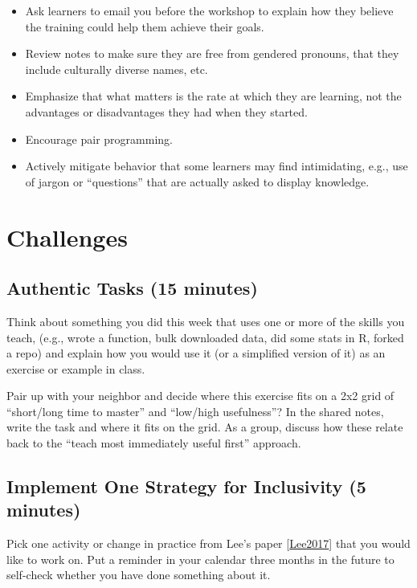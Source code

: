 \documentclass[10pt,statementpaper]{memoir}
\begin{document}
\begin{itemize}
\item
  Ask learners to email you before the workshop to explain how they
  believe the training could help them achieve their goals.
\item
  Review notes to make sure they are free from gendered pronouns, that
  they include culturally diverse names, etc.
\item
  Emphasize that what matters is the rate at which they are learning,
  not the advantages or disadvantages they had when they started.
\item
  Encourage pair programming.
\item
  Actively mitigate behavior that some learners may find intimidating,
  e.g., use of jargon or ``questions'' that are actually asked to
  display knowledge.
\end{itemize}

\section{Challenges}\label{challenges-6}

\subsection*{Authentic Tasks (15
minutes)}\label{authentic-tasks-15-minutes}

Think about something you did this week that uses one or more of the
skills you teach, (e.g., wrote a function, bulk downloaded data, did
some stats in R, forked a repo) and explain how you would use it (or a
simplified version of it) as an exercise or example in class.

Pair up with your neighbor and decide where this exercise fits on a 2x2
grid of ``short/long time to master'' and ``low/high usefulness''? In
the shared notes, write the task and where it fits on the grid. As a
group, discuss how these relate back to the ``teach most immediately
useful first'' approach.

\subsection*{Implement One Strategy for Inclusivity (5
minutes)}\label{implement-one-strategy-for-inclusivity-5-minutes}

Pick one activity or change in practice from Lee's paper
{[}\href{biblio.html\#lee-create-inclusive-community}{Lee2017}{]} that
you would like to work on. Put a reminder in your calendar three months
in the future to self-check whether you have done something about it.
\end{document}
